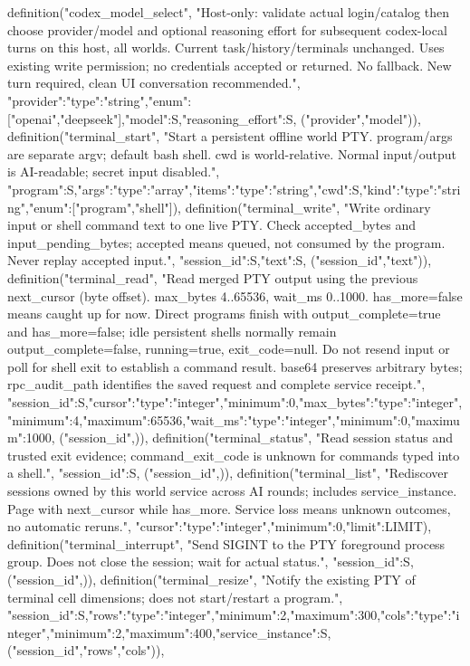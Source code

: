     definition("codex_model_select", "Host-only: validate actual login/catalog then choose provider/model and optional reasoning effort for subsequent codex-local turns on this host, all worlds. Current task/history/terminals unchanged. Uses existing write permission; no credentials accepted or returned. No fallback. New turn required, clean UI conversation recommended.", {"provider":{"type":"string","enum":["openai","deepseek"]},"model":S,"reasoning_effort":S}, ("provider","model")),
    definition("terminal_start", "Start a persistent offline world PTY. program/args are separate argv; default bash shell. cwd is world-relative. Normal input/output is AI-readable; secret input disabled.", {"program":S,"args":{"type":"array","items":{"type":"string"}},"cwd":S,"kind":{"type":"string","enum":["program","shell"]}}),
    definition("terminal_write", "Write ordinary input or shell command text to one live PTY. Check accepted_bytes and input_pending_bytes; accepted means queued, not consumed by the program. Never replay accepted input.", {"session_id":S,"text":S}, ("session_id","text")),
    definition("terminal_read", "Read merged PTY output using the previous next_cursor (byte offset). max_bytes 4..65536, wait_ms 0..1000. has_more=false means caught up for now. Direct programs finish with output_complete=true and has_more=false; idle persistent shells normally remain output_complete=false, running=true, exit_code=null. Do not resend input or poll for shell exit to establish a command result. base64 preserves arbitrary bytes; rpc_audit_path identifies the saved request and complete service receipt.", {"session_id":S,"cursor":{"type":"integer","minimum":0},"max_bytes":{"type":"integer","minimum":4,"maximum":65536},"wait_ms":{"type":"integer","minimum":0,"maximum":1000}}, ("session_id",)),
    definition("terminal_status", "Read session status and trusted exit evidence; command_exit_code is unknown for commands typed into a shell.", {"session_id":S}, ("session_id",)),
    definition("terminal_list", "Rediscover sessions owned by this world service across AI rounds; includes service_instance. Page with next_cursor while has_more. Service loss means unknown outcomes, no automatic reruns.", {"cursor":{"type":"integer","minimum":0},"limit":LIMIT}),
    definition("terminal_interrupt", "Send SIGINT to the PTY foreground process group. Does not close the session; wait for actual status.", {"session_id":S}, ("session_id",)),
    definition("terminal_resize", "Notify the existing PTY of terminal cell dimensions; does not start/restart a program.", {"session_id":S,"rows":{"type":"integer","minimum":2,"maximum":300},"cols":{"type":"integer","minimum":2,"maximum":400},"service_instance":S}, ("session_id","rows","cols")),
